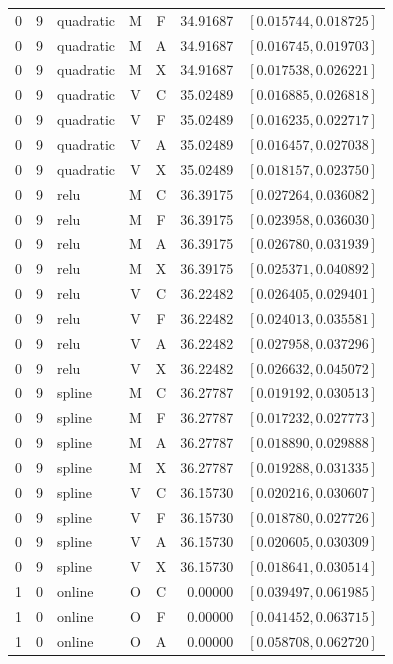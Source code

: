 \begin{longtable}{r r l c c r l}
0 & 9 & quadratic & M & F & 34.91687 & $[0.015744,0.018725]$ \\
0 & 9 & quadratic & M & A & 34.91687 & $[0.016745,0.019703]$ \\
0 & 9 & quadratic & M & X & 34.91687 & $[0.017538,0.026221]$ \\
0 & 9 & quadratic & V & C & 35.02489 & $[0.016885,0.026818]$ \\
0 & 9 & quadratic & V & F & 35.02489 & $[0.016235,0.022717]$ \\
0 & 9 & quadratic & V & A & 35.02489 & $[0.016457,0.027038]$ \\
0 & 9 & quadratic & V & X & 35.02489 & $[0.018157,0.023750]$ \\
0 & 9 & relu & M & C & 36.39175 & $[0.027264,0.036082]$ \\
0 & 9 & relu & M & F & 36.39175 & $[0.023958,0.036030]$ \\
0 & 9 & relu & M & A & 36.39175 & $[0.026780,0.031939]$ \\
0 & 9 & relu & M & X & 36.39175 & $[0.025371,0.040892]$ \\
0 & 9 & relu & V & C & 36.22482 & $[0.026405,0.029401]$ \\
0 & 9 & relu & V & F & 36.22482 & $[0.024013,0.035581]$ \\
0 & 9 & relu & V & A & 36.22482 & $[0.027958,0.037296]$ \\
0 & 9 & relu & V & X & 36.22482 & $[0.026632,0.045072]$ \\
0 & 9 & spline & M & C & 36.27787 & $[0.019192,0.030513]$ \\
0 & 9 & spline & M & F & 36.27787 & $[0.017232,0.027773]$ \\
0 & 9 & spline & M & A & 36.27787 & $[0.018890,0.029888]$ \\
0 & 9 & spline & M & X & 36.27787 & $[0.019288,0.031335]$ \\
0 & 9 & spline & V & C & 36.15730 & $[0.020216,0.030607]$ \\
0 & 9 & spline & V & F & 36.15730 & $[0.018780,0.027726]$ \\
0 & 9 & spline & V & A & 36.15730 & $[0.020605,0.030309]$ \\
0 & 9 & spline & V & X & 36.15730 & $[0.018641,0.030514]$ \\
1 & 0 & online & O & C & 0.00000 & $[0.039497,0.061985]$ \\
1 & 0 & online & O & F & 0.00000 & $[0.041452,0.063715]$ \\
1 & 0 & online & O & A & 0.00000 & $[0.058708,0.062720]$ \\

\end{longtable}
